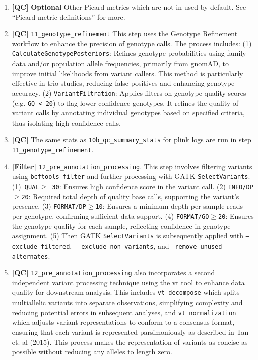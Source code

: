 \begin{enumerate}
    \item \textbf{[QC]} \textbf{Optional} Other Picard metrics which are not in used by default. See ``Picard metric definitions'' for more.
    
      \item \textbf{[QC]} \colorbox{kispiblue!30}{\texttt{11\_genotype\_refinement}} This step uses the Genotype Refinement workflow to enhance the precision of genotype calls. The process includes: (1) \texttt{CalculateGenotypePosteriors}: Refines genotype probabilities using family data and/or population allele frequencies, primarily from gnomAD, to improve initial likelihoods from variant callers. This method is particularly effective in trio studies, reducing false positives and enhancing genotype accuracy. (2) \texttt{VariantFiltration}: Applies filters on genotype quality scores (e.g. \texttt{GQ < 20}) to flag lower confidence genotypes. It refines the quality of variant calls by annotating individual genotypes based on specified criteria, thus isolating high-confidence calls.
      
    \item \textbf{[QC]} The same stats as \colorbox{kispiblue!30}{\texttt{10b\_qc\_summary\_stats}} for plink logs are run in step \colorbox{kispiblue!30}{\texttt{11\_genotype\_refinement}}.
    
   \item \textbf{[Filter]} \colorbox{kispiblue!30}{\texttt{12\_pre\_annotation\_processing}}. This step involves filtering variants using \texttt{bcftools filter} and further processing with GATK \texttt{SelectVariants}.  (1)\texttt{ QUAL$\ge$ 30}: Ensures high confidence score in the variant call. (2) \texttt{INFO/DP$\ge$20}: Required total depth of quality base calls, supporting the variant's presence. (3) \texttt{FORMAT/DP$\ge$10}: Ensures a minimum depth per sample reads per genotype, confirming sufficient data support. (4) \texttt{FORMAT/GQ$\ge$20}: Ensures the genotype quality for each sample, reflecting confidence in genotype assignment. (5) Then GATK \texttt{SelectVariants} is subsequently applied with \texttt{--exclude-filtered}, \texttt{ --exclude-non-variants}, and \texttt{--remove-unused-alternates}.
    
\item \textbf{[QC]} \colorbox{kispiblue!30}{\texttt{12\_pre\_annotation\_processing}} also incorporates a second independent variant processing technique using the vt tool to enhance data quality for downstream analysis. This includes \texttt{vt decompose} which splits multiallelic variants into separate observations, simplifying complexity and reducing potential errors in subsequent analyses, and \texttt{vt normalization}  which adjusts variant representations to conform to a consensus format, ensuring that each variant is represented parsimoniously as described in Tan et. al (2015). This process makes the representation of variants as concise as possible without reducing any alleles to length zero.


\end{enumerate}
